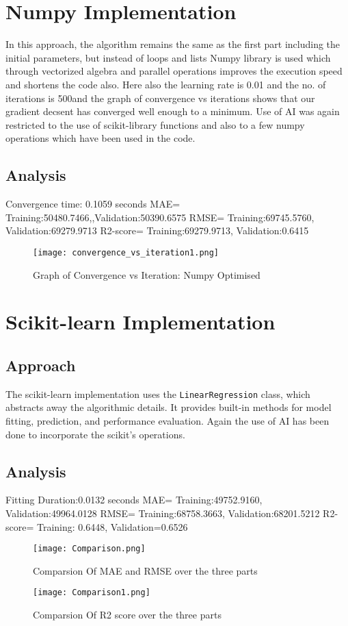 \documentclass[12pt]{article}
\begin{document}
\section{Numpy Implementation}
In this approach, the algorithm remains the same as the first part including the initial parameters, but instead of loops and lists Numpy library is used which through vectorized algebra and parallel operations improves the execution speed and shortens the code also.
Here also the learning rate is 0.01 and the no. of iterations is 500and the graph of convergence vs iterations shows that our gradient decsent has converged well enough to a minimum.
Use of AI was again restricted to the use of scikit-library functions and also to a few numpy operations which have been used in the code.
\subsection{Analysis}
Convergence time: 0.1059 seconds
MAE= Training:50480.7466,,Validation:50390.6575
RMSE= Training:69745.5760, Validation:69279.9713
R2-score= Training:69279.9713, Validation:0.6415
\begin{figure}[h]
    \centering
    \texttt{[image: convergence\_vs\_iteration1.png]}
    \caption{Graph of Convergence vs Iteration: Numpy Optimised}
    \label{fig:Convergence vs Iteration}
\end{figure}
\section{Scikit-learn Implementation}
\subsection{Approach}
The scikit-learn implementation uses the \texttt{LinearRegression} class, which abstracts away the algorithmic details. It provides built-in methods for model fitting, prediction, and performance evaluation.
Again the use of AI has been done to incorporate the scikit's operations.

\subsection{Analysis}
Fitting Duration:0.0132 seconds
MAE= Training:49752.9160, Validation:49964.0128
RMSE= Training:68758.3663, Validation:68201.5212
R2-score= Training: 0.6448, Validation=0.6526
\begin{figure}[h]
    \centering
    \texttt{[image: Comparison.png]}
    \caption{Comparsion Of MAE and RMSE over the three parts}
    \label{fig:Regression Metrics MAE and RMSE}
\end{figure}
\begin{figure}[h]
    \centering
    \texttt{[image: Comparison1.png]}
    \caption{Comparsion Of R2 score over the three parts}
    \label{fig:Regression Metrics R2}
\end{figure}
\end{document}

